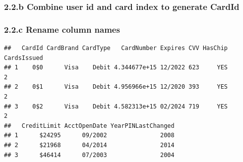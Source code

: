 \documentclass[
]{article}
\newenvironment{Shaded}{\begin{snugshade}}{\end{snugshade}}
\newcommand{\AttributeTok}[1]{\textcolor[rgb]{0.13,0.29,0.53}{#1}}
\newcommand{\DecValTok}[1]{\textcolor[rgb]{0.00,0.00,0.81}{#1}}
\newcommand{\FunctionTok}[1]{\textcolor[rgb]{0.13,0.29,0.53}{\textbf{#1}}}
\newcommand{\NormalTok}[1]{#1}
\newcommand{\OtherTok}[1]{\textcolor[rgb]{0.56,0.35,0.01}{#1}}
\newcommand{\SpecialCharTok}[1]{\textcolor[rgb]{0.81,0.36,0.00}{\textbf{#1}}}
\newcommand{\StringTok}[1]{\textcolor[rgb]{0.31,0.60,0.02}{#1}}
\begin{document}
\subsubsection{2.2.b Combine user id and card index to generate
CardId}\label{b-combine-user-id-and-card-index-to-generate-cardid}

\subsubsection{2.2.c Rename column names}\label{c-rename-column-names}

\begin{Shaded}
\end{Shaded}

\begin{verbatim}
##   CardId CardBrand CardType   CardNumber Expires CVV HasChip CardsIssued
## 1    0$0      Visa    Debit 4.344677e+15 12/2022 623     YES           2
## 2    0$1      Visa    Debit 4.956966e+15 12/2020 393     YES           2
## 3    0$2      Visa    Debit 4.582313e+15 02/2024 719     YES           2
##   CreditLimit AcctOpenDate YearPINLastChanged
## 1      $24295      09/2002               2008
## 2      $21968      04/2014               2014
## 3      $46414      07/2003               2004
\end{verbatim}
\end{document}
